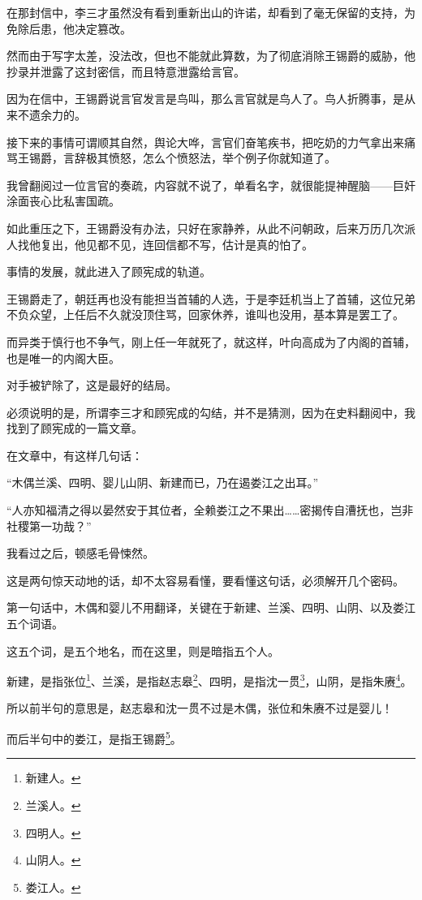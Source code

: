 \begin{multicols}{\theparacolNo}
		在那封信中，李三才虽然没有看到重新出山的许诺，却看到了毫无保留的支持，为免除后患，他决定篡改。

		然而由于写字太差，没法改，但也不能就此算数，为了彻底消除王锡爵的威胁，他抄录并泄露了这封密信，而且特意泄露给言官。

		因为在信中，王锡爵说言官发言是鸟叫，那么言官就是鸟人了。鸟人折腾事，是从来不遗余力的。

		接下来的事情可谓顺其自然，舆论大哗，言官们奋笔疾书，把吃奶的力气拿出来痛骂王锡爵，言辞极其愤怒，怎么个愤怒法，举个例子你就知道了。

		我曾翻阅过一位言官的奏疏，内容就不说了，单看名字，就很能提神醒脑——巨奸涂面丧心比私害国疏。

		如此重压之下，王锡爵没有办法，只好在家静养，从此不问朝政，后来万历几次派人找他复出，他见都不见，连回信都不写，估计是真的怕了。

		事情的发展，就此进入了顾宪成的轨道。

		王锡爵走了，朝廷再也没有能担当首辅的人选，于是李廷机当上了首辅，这位兄弟不负众望，上任后不久就没顶住骂，回家休养，谁叫也没用，基本算是罢工了。

		而异类于慎行也不争气，刚上任一年就死了，就这样，叶向高成为了内阁的首辅，也是唯一的内阁大臣。

		对手被铲除了，这是最好的结局。

		必须说明的是，所谓李三才和顾宪成的勾结，并不是猜测，因为在史料翻阅中，我找到了顾宪成的一篇文章。

		在文章中，有这样几句话：

		“木偶兰溪、四明、婴儿山阴、新建而已，乃在遏娄江之出耳。”

		“人亦知福清之得以晏然安于其位者，全赖娄江之不果出……密揭传自漕抚也，岂非社稷第一功哉？”

		我看过之后，顿感毛骨悚然。

		这是两句惊天动地的话，却不太容易看懂，要看懂这句话，必须解开几个密码。

		第一句话中，木偶和婴儿不用翻译，关键在于新建、兰溪、四明、山阴、以及娄江五个词语。

		这五个词，是五个地名，而在这里，则是暗指五个人。

		新建，是指张位\footnote{新建人。}、兰溪，是指赵志皋\footnote{兰溪人。}、四明，是指沈一贯\footnote{四明人。}，山阴，是指朱赓\footnote{山阴人。}。

		所以前半句的意思是，赵志皋和沈一贯不过是木偶，张位和朱赓不过是婴儿！

		而后半句中的娄江，是指王锡爵\footnote{娄江人。}。


\end{multicols}
